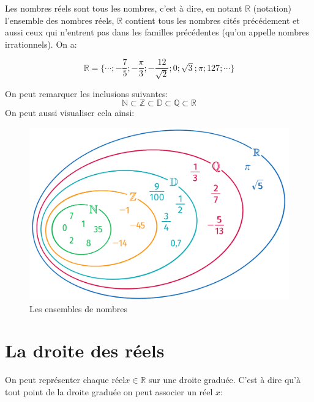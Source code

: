 \documentclass[10pt,a4paper]{book}
\newcommand{\N}{\mathbb{N}}
\newcommand{\Z}{\mathbb{Z}}
\newcommand{\D}{\mathbb{D}}
\newcommand{\Q}{\mathbb{Q}}
\newcommand{\R}{\mathbb{R}}
\begin{document}
Les nombres réels sont tous les nombres, c'est à dire, en notant $\R$ 
(notation) l'ensemble des nombres réels, $\R$ contient tous les nombres cités précédement et aussi ceux 
qui n'entrent pas dans les familles précédentes (qu'on appelle nombres irrationnels). On a:

$$\R=\{\cdots;-\frac{7}{5};-\frac{\pi}{3};-\frac{12}{\sqrt{2}};0;\sqrt{3};\pi;127;\cdots\}$$

On peut remarquer les inclusions suivantes:
$$\N\subset\Z\subset\D\subset\Q\subset\R$$
On peut aussi visualiser cela ainsi:



\begin{figure}[htbp]
\centering
\includegraphics[width=1.0\textwidth]{Ensemble.png}
\caption{Les ensembles de nombres}
\label{fig:Ensembles}
\end{figure}



\section{La droite des réels}

On peut représenter chaque réel$x\in\R$ sur une droite graduée. C'est à dire 
qu'à tout point de la droite graduée on peut associer un réel $x$:
\end{document}
